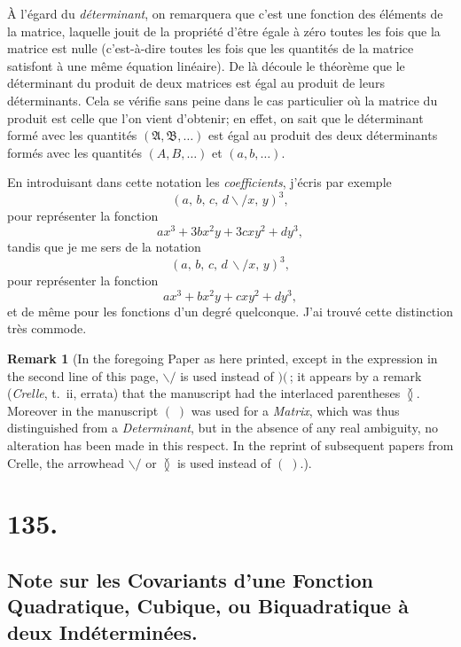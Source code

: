 \documentclass[11pt,a4paper]{article}
\theoremstyle{definition}
\newtheorem*{remark}{Remark}
\begin{document}
\medskip

\`A l'\'egard du \textit{d\'eterminant}, on remarquera que c'est une
fonction des \'el\'ements de la matrice, laquelle jouit de la propri\'et\'e
d'\^etre \'egale \`a z\'ero toutes les fois que la matrice est nulle (c'est-\`a-dire
toutes les fois que les quantit\'es de la matrice satisfont \`a une m\^eme
\'equation lin\'eaire). De l\`a d\'ecoule le th\'eor\`eme que le d\'eterminant
du produit de deux matrices est \'egal au produit de leurs d\'eterminants.
Cela se v\'erifie sans peine dans le cas particulier o\`u la matrice du
produit est celle que l'on vient d'obtenir; en effet, on sait que le
d\'eterminant form\'e avec les quantit\'es $(\mathfrak{A},\mathfrak{B},\ldots)$
est \'egal au produit des deux d\'eterminants form\'es avec les quantit\'es
$(A, B,\ldots)$ et $(a, b,\ldots)$.

\medskip

En introduisant dans cette notation les \textit{coefficients}, j'\'ecris
par exemple
\[
(a,\, b,\, c,\, d\!\!\backslash\!\!\!/ x,\, y)^3,
\]
pour repr\'esenter la fonction
\[
ax^3 + 3bx^2y + 3cxy^2 + dy^3,
\]
tandis que je me sers de la notation
\[
(a,\, b,\, c,\, d\,\backslash\!\!\!/ x,\, y)^3,
\]
pour repr\'esenter la fonction
\[
ax^3 + bx^2y + cxy^2 + dy^3,
\]
et de m\^eme pour les fonctions d'un degr\'e quelconque. J'ai trouv\'e cette
distinction tr\`es commode.

\begin{remark}
[In the foregoing Paper as here printed, except in the expression in the
second line of this page, $\backslash\!\!\!/$ is used instead of $)(\,$;
it appears by a remark (\textit{Crelle}, t.~ii, errata) that the
manuscript had the interlaced parentheses $\between$. Moreover in the
manuscript $(\;)$ was used for a \textit{Matrix}, which was thus
distinguished from a \textit{Determinant}, but in the absence of any real
ambiguity, no alteration has been made in this respect. In the reprint of
subsequent papers from Crelle, the arrowhead $\backslash\!\!\!/$ or
$\between$ is used instead of $(\;)$.]
\end{remark}

\newpage
\section*{135.}
\subsection*{Note sur les Covariants d'une Fonction Quadratique, Cubique, ou Biquadratique \`a deux Ind\'etermin\'ees.}
\end{document}

